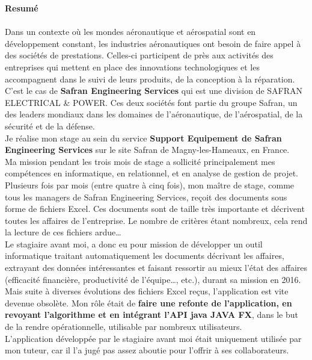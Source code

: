 \textbf  {Resumé} \hskip7mm \\
\\

Dans un contexte où les mondes aéronautique et aérospatial sont en développement constant, les industries aéronautiques ont besoin de faire appel à des sociétés de prestations. Celles-ci participent de près aux activités des entreprises qui mettent en place des innovations technologiques et les accompagnent dans le suivi de leurs produits, de la conception à la réparation. C’est le cas de \textbf{Safran Engineering Services} qui est une division de SAFRAN ELECTRICAL \& POWER. Ces deux sociétés font partie du groupe Safran, un des leaders mondiaux dans les domaines de l’aéronautique, de l’aérospatial, de la sécurité et de la défense.\\

Je réalise mon stage au sein du service \textbf {Support Equipement de Safran Engineering Services} sur le site Safran de Magny-les-Hameaux, en France.\\

Ma mission pendant les trois mois de stage a sollicité principalement mes compétences en informatique, en relationnel, et en analyse de gestion de projet.\\

Plusieurs fois par mois (entre quatre à cinq fois), mon maître de stage, comme tous les managers de Safran Engineering Services, reçoit des documents sous forme de fichiers Excel. Ces documents sont de taille très importante et décrivent toutes les affaires de l’entreprise. Le nombre de critères étant nombreux, cela rend la lecture de ces fichiers ardue…\\

Le stagiaire avant moi, a donc eu pour mission de développer un outil informatique traitant automatiquement les documents décrivant les affaires, extrayant des données intéressantes et faisant ressortir au mieux l’état des affaires (efficacité financière, productivité de l’équipe…, etc.), durant sa mission en 2016.\\

Mais suite à diverses évolutions des fichiers Excel reçus, l’application est vite devenue obsolète.
Mon rôle était de \textbf{faire une refonte de l’application, en revoyant l’algorithme et en intégrant l’API java JAVA FX}, dans le but de la rendre opérationnelle, utilisable par nombreux utilisateurs.\\

L’application développée par le stagiaire avant moi était uniquement utilisée par mon tuteur, car il l’a jugé pas assez aboutie pour l’offrir à ses collaborateurs.\\


